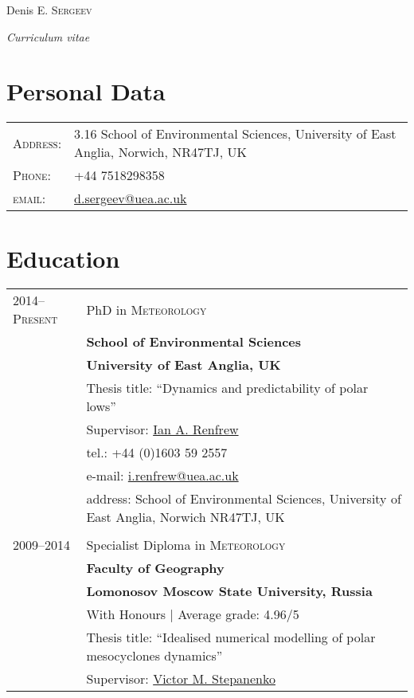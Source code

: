 \documentclass[a4paper,10pt]{article}
\newlength{\mycol}
\begin{document}
\pagestyle{empty} %
\flushleft

\par{\centering
		{\Huge Denis E. \textsc{Sergeev} \par
		 \normalsize \textit{Curriculum vitae}
		
	}\bigskip\par}

\section{Personal Data}
\renewcommand{\arraystretch}{1.2}
\begin{tabu} to 
    \textsc{Address:}   & 3.16 School of Environmental Sciences, University of East Anglia, Norwich,  NR47TJ, UK \\
    \textsc{Phone:}     & +44 7518298358\\
    \textsc{email:}     & \href{mailto:d.sergeev@uea.ac.uk}{d.sergeev@uea.ac.uk}
\end{tabu}
\renewcommand{\arraystretch}{1}

 \renewcommand{\labelitemi}{\scriptsize$\blacksquare$} 

\section{Education}
\begin{tabu} to 
 \textsc{2014--\small{Present}} & PhD in \textsc{Meteorology}\\
& \textbf{School of Environmental Sciences} \\
& \textbf{University of East Anglia, UK} \\
& Thesis title: ``Dynamics and predictability of polar lows'' \\
& Supervisor: \href{mailto:I.Renfrew@uea.ac.uk}{Ian A. Renfrew} \\
& \quad tel.: +44 (0)1603 59 2557 \\
& \quad e-mail: \href{mailto:i.renfrew@uea.ac.uk}{i.renfrew@uea.ac.uk} \\
& \quad address: School of Environmental Sciences, University of East Anglia, Norwich NR47TJ, UK \\
 \\
 \textsc{2009--2014} & Specialist Diploma in \textsc{Meteorology}\\
& \textbf{Faculty of Geography} \\
& \textbf{Lomonosov Moscow State University, Russia} \\
& With Honours \hfill | Average grade: 4.96/5 
\\ %
& Thesis title: ``Idealised numerical modelling of polar mesocyclones dynamics'' \\
& Supervisor: \href{mailto:stepanen@srcc.msu.ru}{Victor M. Stepanenko}
\end{tabu}
\end{document}
